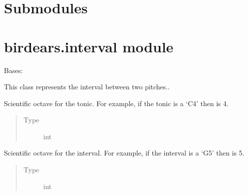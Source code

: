 \documentclass[letterpaper,10pt,english]{sphinxmanual}
\begin{document}
\section{Submodules}
\label{\detokenize{birdears:submodules}}

\section{birdears.interval module}
\label{\detokenize{birdears:module-birdears.interval}}\label{\detokenize{birdears:birdears-interval-module}}

\begin{fulllineitems}
\label{\detokenize{birdears:birdears.interval.Interval}}
Bases: 

This class represents the interval between two pitches..

\begin{fulllineitems}
\label{\detokenize{birdears:birdears.interval.Interval.tonic_octave}}
Scientific octave for the tonic. For example, if
the tonic is a ‘C4’ then  is 4.
\begin{quote}\begin{description}
\item[{Type}] \leavevmode
int

\end{description}\end{quote}

\end{fulllineitems}



\begin{fulllineitems}
Scientific octave for the interval. For example,
if the interval is a ‘G5’ then  is 5.
\begin{quote}\begin{description}
\item[{Type}] \leavevmode
int


\end{description}
\end{quote}
\end{fulllineitems}
\end{fulllineitems}
\end{document}
